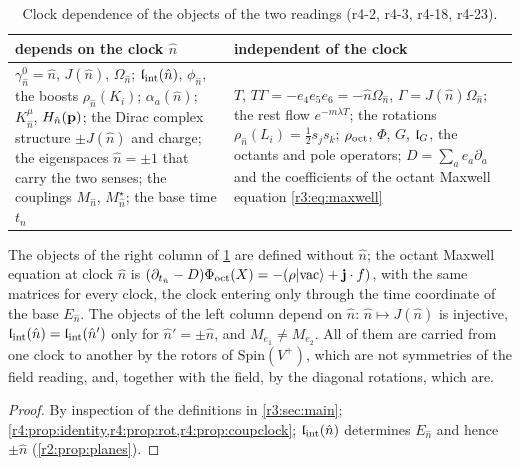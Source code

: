 \begin{table}[t]
\centering
\footnotesize
\renewcommand{\arraystretch}{1.15}
\begin{tabular}{@{}>{\raggedright\arraybackslash}p{7.3cm}>{\raggedright\arraybackslash}p{7.3cm}@{}}
\toprule
depends on the clock $\hat n$ & independent of the clock\\
\midrule
$\gamma^0_{\hat n}=\hat n$, $J(\hat n)$, $\Omega_{\hat n}$; $\mathfrak l_{\rm int}(\hat n)$, $\phi_{\hat n}$, the boosts $\rho_{\hat n}(K_i)$; $\alpha_a(\hat n)$; $K^\mu_{\hat n}$, $H_{\hat n}(\mathbf p)$; the Dirac complex structure $\pm J(\hat n)$ and charge;
the eigenspaces $\hat n=\pm1$ that carry the two senses; the couplings $M_{\hat n}$, $M^\star_{\hat n}$; the base time $t_{\hat n}$ &
$T$, $T\Gamma=-e_4e_5e_6=-\hat n\Omega_{\hat n}$, $\Gamma=J(\hat n)\Omega_{\hat n}$; the rest flow $e^{-m\lambda T}$; the rotations $\rho_{\hat n}(L_i)=\tfrac12s_js_k$; $\rho_{\rm oct}$, $\Phi$, $G$, $\mathfrak l_G$, the octants and
pole operators; $D=\sum_ae_a\partial_a$ and the coefficients of the octant Maxwell equation \cref{r3:eq:maxwell}\\
\bottomrule
\end{tabular}
\caption{Clock dependence of the objects of the two readings (r4-2, r4-3, r4-18, r4-23).}
\label{r4:tab:clock}
\end{table}

\begin{proposition}
\label{r4:prop:clockdep}
The objects of the right column of \cref{r4:tab:clock} are defined without $\hat n$; the octant Maxwell equation at clock $\hat n$ is
$(\partial_{t_{\hat n}}-D)\Phi_{\rm oct}(X)=-(\rho|\mathrm{vac}\rangle+\mathbf j\cdot f)$, with the same matrices for every clock, the clock entering only through the time coordinate of the
base $E_{\hat n}$. The objects of the left column depend on $\hat n$: $\hat n\mapsto J(\hat n)$ is injective, $\mathfrak l_{\rm int}(\hat n)=\mathfrak l_{\rm int}(\hat n')$ only for $\hat n'=\pm \hat n$, and $M_{e_1}\neq M_{e_2}$. All of
them are carried from one clock to another by the rotors of $\mathrm{Spin}(V^+)$, which are not symmetries of the field reading, and, together with the field,
by the diagonal rotations, which are.
\end{proposition}

\begin{proof}
By inspection of the definitions in \cref{r3:sec:main}; \cref{r4:prop:identity,r4:prop:rot,r4:prop:coupclock}; $\mathfrak l_{\rm int}(\hat n)$ determines $E_{\hat n}$ and hence $\pm \hat n$ (\cref{r2:prop:planes}).
\end{proof}

